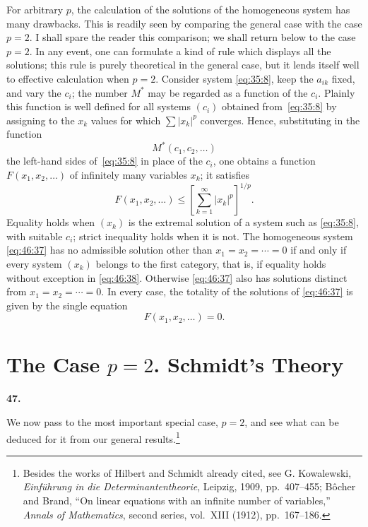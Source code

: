 \documentclass[
  paper=b5,
  fontsize=13pt,
  twoside=true,
  open=any,
  bookmarkpackage=false,
  chapterprefix=true,
  headings=normal
]{scrbook}
\theoremstyle{definition}
\newcommand{\numberedparagraph}[1]{%
  \par\medskip\phantomsection\label{sec:#1}%
  \noindent\textbf{#1.}\enspace
}
\begin{document}
For arbitrary $p$, the calculation of the solutions of the homogeneous
system has many drawbacks. This is readily seen by comparing the general
case with the case $p=2$. I shall spare the reader this comparison; we shall
return below to the case $p=2$. In any event, one can formulate a kind of
rule which displays all the solutions; this rule is purely theoretical in
the general case, but
it lends itself well to effective calculation when $p=2$. Consider system
\eqref{eq:35:8}, keep the $a_{ik}$ fixed, and vary the $c_i$; the number $M^*$ may be
regarded as a function of the $c_i$. Plainly this function is well defined
for all systems $(c_i)$ obtained from~\eqref{eq:35:8} by assigning to the $x_k$ values
for which $\sum|x_k|^p$ converges. Hence, substituting in the function
\[
  M^*(c_1,c_2,\ldots)
\]
the left-hand sides of~\eqref{eq:35:8} in place of the $c_i$, one obtains a function
$F(x_1,x_2,\ldots)$ of infinitely many variables $x_k$; it satisfies
\begin{equation}
  F(x_1,x_2,\ldots)
  \leq\left[\sum_{k=1}^{\infty}|x_k|^p\right]^{1/p}.
  \tag{38}\label{eq:46:38}
\end{equation}
Equality holds when $(x_k)$ is the extremal solution of a system such as
\eqref{eq:35:8}, with suitable $c_i$; strict inequality holds when it is not. The
homogeneous system \eqref{eq:46:37} has no admissible solution other than
$x_1=x_2=\cdots=0$ if and only if every system $(x_k)$ belongs to the first
category, that is, if equality holds without exception in
\eqref{eq:46:38}. Otherwise \eqref{eq:46:37} also has solutions distinct
from $x_1=x_2=\cdots=0$. In every case, the totality of the solutions of
\eqref{eq:46:37} is given by the single equation
\[
  F(x_1,x_2,\ldots)=0.
\]

\section{The Case \texorpdfstring{\(p=2\)}{p = 2}. Schmidt's Theory}

\numberedparagraph{47}
We now pass to the most important special case, $p=2$, and see what can be
deduced for it from our general results.\footnote{Besides the works of
Hilbert and Schmidt already cited, see G. Kowalewski, \emph{Einf\"uhrung in
  die Determinantentheorie}, Leipzig, 1909, pp.~407--455; B\^ocher and Brand,
``On linear equations with an infinite number of variables,'' \emph{Annals
of Mathematics}, second series, vol.~XIII (1912), pp.~167--186.}
\end{document}
